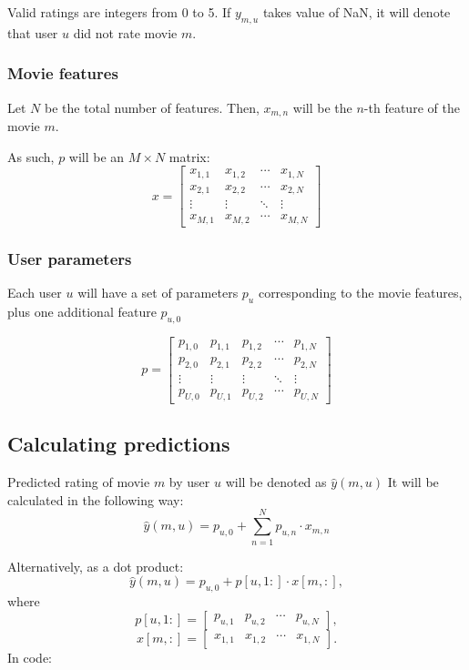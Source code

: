 \documentclass[12pt]{article}
\begin{document}
Valid ratings are integers from 0 to 5.
If $y_{m,u}$ takes value of NaN, it will denote that user $u$ did not rate movie $m$.

\subsubsection{Movie features}

Let $N$ be the total number of features.
Then, $x_{m,n}$ will be the $n$-th feature of the movie $m$.

As such, $p$ will be an $M \times N$ matrix:
$$ x =
	\begin{bmatrix}
		x_{1,1} & x_{1,2} & \cdots & x_{1,N} \\
		x_{2,1} & x_{2,2} & \cdots & x_{2,N} \\
		\vdots  & \vdots  & \ddots & \vdots  \\
		x_{M,1} & x_{M,2} & \cdots & x_{M,N}
	\end{bmatrix}
$$

\subsubsection{User parameters}

Each user $u$ will have a set of parameters $p_u$ corresponding to the movie features,
plus one additional feature $p_{u,0}$

$$ p =
	\begin{bmatrix}
		p_{1,0} & p_{1,1} & p_{1,2} & \cdots & p_{1,N} \\
		p_{2,0} & p_{2,1} & p_{2,2} & \cdots & p_{2,N} \\
		\vdots  & \vdots  & \vdots  & \ddots & \vdots  \\
		p_{U,0} & p_{U,1} & p_{U,2} & \cdots & p_{U,N}
	\end{bmatrix}
$$

\subsection{Calculating predictions}

Predicted rating of movie $m$ by user $u$ will be denoted as $\hat{y}(m,u)$
It will be calculated in the following way:
$$
	\hat{y}(m,u) = p_{u,0} + \sum\limits_{n=1}^N p_{u,n} \cdot x_{m,n}
$$

Alternatively, as a dot product:
$$
	\hat{y}(m,u) = p_{u,0} + p[u,1\!:] \cdot x[m,:],
$$
where
$$
	p[u,1\!:] = \begin{bmatrix}
		p_{u,1} & p_{u,2} & \cdots & p_{u,N}
	\end{bmatrix},$$
$$
	x[m,:] = \begin{bmatrix}
		x_{1,1} & x_{1,2} & \cdots & x_{1,N}
	\end{bmatrix}.
$$
In code:
\end{document}
